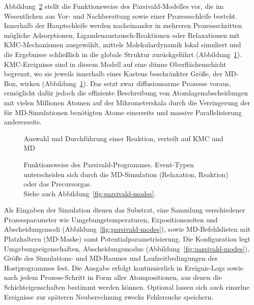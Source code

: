 Abbildung~\ref{fig:parsivald-stephierarchy} stellt die Funktionsweise des Parsivald-Modelles vor, die im Wesentlichen aus Vor- und Nachbereitung sowie einer Prozessschleife besteht.
Innerhalb der Hauptschleife werden nacheinander in mehreren Prozessschritten mögliche Adsorptionen, Ligandenaustausch-Reaktionen oder Relaxationen mit KMC-Mechanismen ausgewählt, mittels Molekulardynamik lokal simuliert und die Ergebnisse schließlich in die globale Struktur zurückgeführt (Abbildung~\ref{fig:parsivald-schema}).
KMC-Ereignisse sind in diesem Modell auf eine dünne Oberflächenschicht begrenzt, wo sie jeweils innerhalb eines Kastens beschränkter Größe, der MD-Box, wirken (Abbildung~\ref{fig:parsivald-schema}).
Das setzt zwar diffusionsarme Prozesse voraus, ermöglicht dafür jedoch die effiziente Beschreibung von Atomlagenabscheidungen mit vielen Millionen Atomen auf der Mikrometerskala durch die Verringerung der für MD-Simulationen benötigten Atome einerseits und massive Parallelisierung andererseits.

\begin{figure}
  \centering
  \def\svgwidth{\textwidth}
  
  \caption{Auswahl und Durchführung einer Reaktion, verteilt auf KMC und MD}
  \label{fig:parsivald-schema}
\end{figure}

\begin{figure}
  \centering
  \def\svgwidth{\textwidth}
  
  \caption[Funktionsweise des Parsivald-Programmes]{
    Funktionsweise des Parsivald-Programmes.
    Event-Typen unterscheiden sich durch die MD-Simulation (Relaxation, Reaktion) oder das Precursorgas.\\
    Siehe auch Abbildung~\ref{fig:parsivald-modes}.
  }
  \label{fig:parsivald-stephierarchy}
\end{figure}

Als Eingaben der Simulation dienen das Substrat, eine Sammlung verschiedener Prozessparameter wie Umgebungstemperaturen, Expositionszeiten und Abscheidungsmodi (Abbildung~\ref{fig:parsivald-modes}), sowie MD-Befehlslisten mit Platzhaltern (MD-Maske) samt Potentialparametrisierung.
Die Konfiguration legt Umgebungseigenschaften, Abscheidungsmodus (Abbildung~\ref{fig:parsivald-modes}), Größe des Simulations- und MD-Raumes und Laufzeitbedingungen des Hostprogrammes fest.
Die Ausgabe erfolgt kontinuierlich in Ereignis-Logs sowie nach jedem Prozess-Schritt in Form aller Atompositionen, aus denen die Schichteigenschaften bestimmt werden können.
Optional lassen sich auch einzelne Ereignisse zur späteren Neuberechnung zwecks Fehlersuche speichern.

